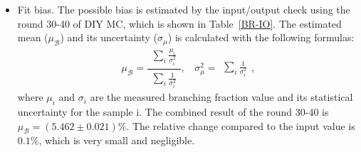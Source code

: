 \documentclass[aps,prd,twocolumn,showpacs,amsmath,amssymb]{revtex4-1}
\begin{document}
\begin{itemize}
    \item Fit bias. The possible bias is estimated by the input/output check using the round 30-40 of DIY MC, which is shown in Table~\ref{BR-IO}. 
        The estimated mean ($\mu_{\mathcal{B}}$) and its uncertainty ($\sigma_{\mu}$) is calculated with the following formulas:
        \begin{equation}
        \mu_{\mathcal{B}} = \frac{\begin{matrix}\sum_{i}\frac{\mu_{i}}{\sigma_{i}^{2}}\end{matrix}}{\begin{matrix}\sum_{i}\frac{1}{\sigma_{i}^{2}}\end{matrix}}, \ \ \ \ \sigma_{\mu}^{2}=\begin{matrix}\sum_{i}\frac{1}{\sigma_{i}^{2}}\end{matrix},
            \label{BR-Combined}
        \end{equation}
        where $\mu_{i}$ and $\sigma_{i}$ are the measured branching fraction value and its statistical uncertainty for the sample i. The combined result of the round 30-40 is $\mu_{\mathcal{B}} = (5.462 \pm 0.021)\%$. 
        The relative change compared to the input value is $0.1\%$, which is very small and negligible.


\end{itemize}
\end{document}
